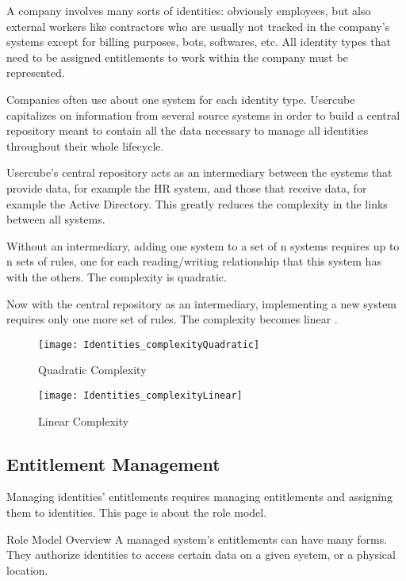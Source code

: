A company involves many sorts of identities: obviously employees, but also external workers like contractors who are usually not tracked in the company's systems except for billing purposes, bots, softwares, etc. All identity types that need to be assigned entitlements to work within the company must be represented.

Companies often use about one system for each identity type. Usercube capitalizes on information from several source systems in order to build a central repository meant to contain all the data necessary to manage all identities throughout their whole lifecycle.

Usercube's central repository acts as an intermediary between the systems that provide data, for example the HR system, and those that receive data, for example the Active Directory. This greatly reduces the complexity in the links between all systems.

Without an intermediary, adding one system to a set of n systems requires up to n sets of rules, one for each reading/writing relationship that this system has with the others. The complexity is quadratic.

Now with the central repository as an intermediary, implementing a new system requires only one more set of rules. The complexity becomes linear \cite{UsercubeDocument}.

\begin{figure}[htbp]
  \centering
  \begin{minipage}{0.48\textwidth}
    \texttt{[image: Identities\_complexityQuadratic]}
    \caption{Quadratic Complexity}
    \label{fig:Identities_complexityQuadratic}
  \end{minipage}\hfill
  \begin{minipage}{0.48\textwidth}
    \texttt{[image: Identities\_complexityLinear]}
    \caption{Linear Complexity}
    \label{fig:Identities_complexityLinear}
  \end{minipage}
\end{figure}


\subsection{Entitlement Management}
\label{sec:Template}

Managing identities' entitlements requires managing entitlements and assigning them to identities. This page is about the role model.

Role Model Overview
A managed system's entitlements can have many forms. They authorize identities to access certain data on a given system, or a physical location.

